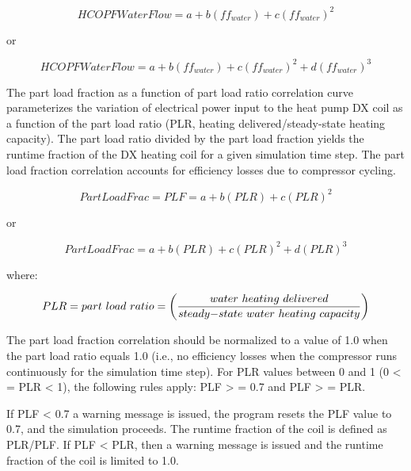 \begin{equation}
HCOPFWaterFlow = a + b\left( {f{f_{water}}} \right) + c{\left( {f{f_{water}}} \right)^2}
\end{equation}

or

\begin{equation}
HCOPFWaterFlow = a + b\left( {f{f_{water}}} \right) + c{\left( {f{f_{water}}} \right)^2} + d{\left( {f{f_{water}}} \right)^3}
\end{equation}

The part load fraction as a function of part load ratio correlation curve parameterizes the variation of electrical power input to the heat pump DX coil as a function of the part load ratio (PLR, heating delivered/steady-state heating capacity). The part load ratio divided by the part load fraction yields the runtime fraction of the DX heating coil for a given simulation time step. The part load fraction correlation accounts for efficiency losses due to compressor cycling.

\begin{equation}
PartLoadFrac = PLF = a + b\left( {PLR} \right) + c{\left( {PLR} \right)^2}
\end{equation}

or

\begin{equation}
PartLoadFrac = a + b\left( {PLR} \right) + c{\left( {PLR} \right)^2} + d{\left( {PLR} \right)^3}
\end{equation}

where:

\begin{equation}
PLR = part~load~ratio = \left( {\frac{{water~heating~delivered}}{{steady{\rm{ - }}state~water~heating~capacity}}} \right)
\end{equation}

The part load fraction correlation should be normalized to a value of 1.0 when the part load ratio equals 1.0 (i.e., no efficiency losses when the compressor runs continuously for the simulation time step). For PLR values between 0 and 1 (0 \textless{} = PLR \textless{} 1), the following rules apply:  PLF \textgreater{} = 0.7 and PLF \textgreater{} = PLR.

If PLF \textless{} 0.7 a warning message is issued, the program resets the PLF value to 0.7, and the simulation proceeds. The runtime fraction of the coil is defined as PLR/PLF. If PLF \textless{} PLR, then a warning message is issued and the runtime fraction of the coil is limited to 1.0.


